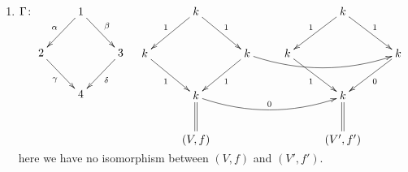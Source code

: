 \begin{exam}
\begin{enumerate}[(1)]
\item \(\Gamma\colon \xymatrix{ & 1\ar[dl]_\alpha\ar[dr]^\beta & \\
                            2\ar[dr]_\gamma & & 3\ar[dl]^\delta\\
                            & 4 & }
                            \quad
                            \xymatrix{ & k\ar[dl]_1\ar[dr]^1 & & & k\ar[dl]_1\ar[dr]^1 & \\
                            k\ar[dr]_1 & & k\ar[dl]^1\ar@/_1pc/[rrr] & k\ar[dr]_1 & & k\ar[dl]^0\\
                            & k\ar@{=}[d]\ar@/_1pc/[rrr]^0  & & & k\ar@{=}[d] & \\
                            &(V, f) & & & (V', f')& }\)
                            here we have no isomorphism between \((V, f)\) and \((V', f')\).
\end{enumerate}
\end{exam}
